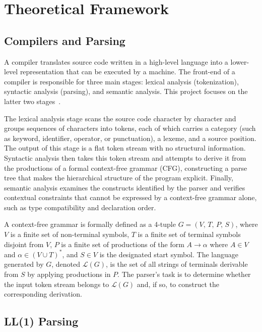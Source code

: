 \documentclass[letterpaper,12pt,oneside]{article}
\begin{document}
\section{Theoretical Framework}

\subsection{Compilers and Parsing}

A compiler translates source code written in a high-level language into a lower-level representation that can be executed by a machine. The front-end of a compiler is responsible for three main stages: lexical analysis (tokenization), syntactic analysis (parsing), and semantic analysis. This project focuses on the latter two stages~\cite{1}.

The lexical analysis stage scans the source code character by character and groups sequences of characters into tokens, each of which carries a category (such as keyword, identifier, operator, or punctuation), a lexeme, and a source position. The output of this stage is a flat token stream with no structural information. Syntactic analysis then takes this token stream and attempts to derive it from the productions of a formal context-free grammar
(CFG), constructing a parse tree that makes the hierarchical structure of the program explicit. Finally, semantic analysis examines the constructs identified by the parser and verifies contextual constraints that cannot be expressed by a context-free grammar alone, such as type compatibility and declaration order.

A context-free grammar is formally defined as a 4-tuple
$G = (V,\, T,\, P,\, S)$, where $V$ is a finite set of non-terminal symbols, $T$ is a finite set of terminal symbols disjoint from $V$, $P$ is a finite set of productions of the form $A \rightarrow \alpha$ where $A \in V$ and $\alpha \in (V \cup T)^{*}$, and $S \in V$ is the designated start symbol.
The language generated by $G$, denoted $\mathcal{L}(G)$, is the set of all strings of terminals derivable from $S$ by applying productions in $P$. The parser's task is to determine whether the input token stream belongs to $\mathcal{L}(G)$ and, if so, to construct the corresponding derivation.

\subsection{LL(1) Parsing}
\end{document}
